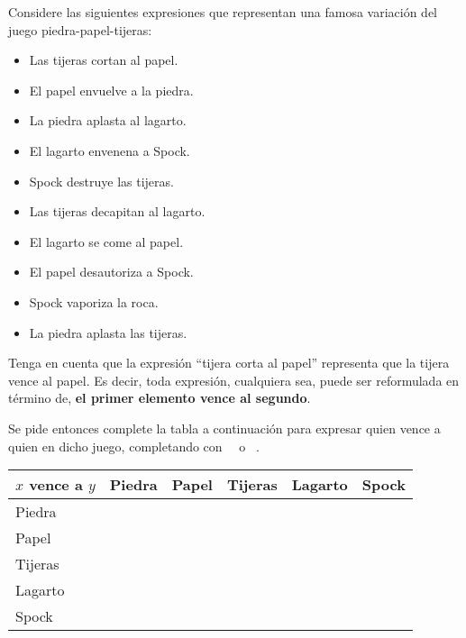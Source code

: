 \begin{exercise}
    Considere las siguientes expresiones que representan una famosa variación del juego piedra-papel-tijeras:

    \begin{itemize}
        \item Las tijeras cortan al papel.
        \item El papel envuelve a la piedra.
        \item La piedra aplasta al lagarto.
        \item El lagarto envenena a Spock.
        \item Spock destruye las tijeras.
        \item Las tijeras decapitan al lagarto.
        \item El lagarto se come al papel.
        \item El papel desautoriza a Spock.
        \item Spock vaporiza la roca.
        \item La piedra aplasta las tijeras.
    \end{itemize}

    Tenga en cuenta que la expresión ``tijera corta al papel'' representa que la tijera vence al papel. Es decir, toda expresión, cualquiera sea, puede ser reformulada en término de, \textbf{el primer elemento vence al segundo}.

    Se pide entonces complete la tabla a continuación para expresar quien vence a quien en dicho juego, completando con ~\ltrue ~o~ \lfalse.

    \begin{tabular}{| l | c | c | c | c | c |}
        \hline
        $x$ vence a $y$ & Piedra & Papel & Tijeras & Lagarto & Spock \\
        \hline
        Piedra&&&&&\\
        \hline
        Papel&&&&&\\
        \hline
        Tijeras&&&&&\\
        \hline
        Lagarto&&&&&\\
        \hline
        Spock&&&&&\\
        \hline
    \end{tabular}
\end{exercise}